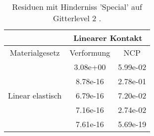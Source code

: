 \begin{table} 
\centering 
\begin{tabular}{c|cc|} 
\cline{2-3} 
 & \multicolumn{2}{|c|}{Linearer Kontakt} \\ 
\hline 
\multicolumn{1}{|c|}{Materialgesetz} & \multicolumn{1}{c|}{Verformung} & \multicolumn{1}{c|}{NCP} \\ 
\hline 
\multicolumn{1}{|c|}{\multirow{5}{*}{Linear elastisch}} &\multicolumn{1}{|c|}{  3.08e+00} & \multicolumn{1}{|c|}{  5.99e-02} \\ 
\multicolumn{1}{|c|}{} & \multicolumn{1}{|c|}{  8.78e-16} & \multicolumn{1}{|c|}{  2.78e-01} \\ 
\multicolumn{1}{|c|}{} & \multicolumn{1}{|c|}{  6.79e-16} & \multicolumn{1}{|c|}{  7.20e-02} \\ 
\multicolumn{1}{|c|}{} & \multicolumn{1}{|c|}{  7.16e-16} & \multicolumn{1}{|c|}{  2.74e-02} \\ 
\multicolumn{1}{|c|}{} & \multicolumn{1}{|c|}{  7.61e-16} & \multicolumn{1}{|c|}{  5.69e-19} \\ 
\hline 
\end{tabular}\caption{Residuen mit Hinderniss 'Special' auf Gitterlevel 2 .}\label{tab:Residuum_Special_level2}
\end{table} 

